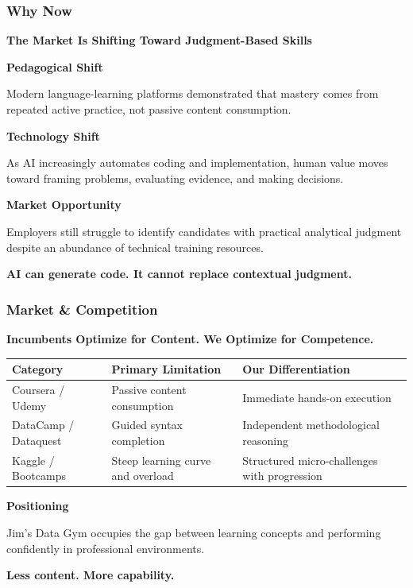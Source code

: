 \documentclass[aspectratio=169]{beamer}
\begin{document}
\begin{frame}
\frametitle{\textcolor{AccentPink}{Why Now}}

\Large \textbf{The Market Is Shifting Toward Judgment-Based Skills}

\vspace{0.3cm}

\textbf{Pedagogical Shift}

Modern language-learning platforms demonstrated that mastery comes from repeated active practice, not passive content consumption.

\vspace{0.2cm}

\textbf{Technology Shift}

As AI increasingly automates coding and implementation, human value moves toward framing problems, evaluating evidence, and making decisions.

\vspace{0.2cm}

\textbf{Market Opportunity}

Employers still struggle to identify candidates with practical analytical judgment despite an abundance of technical training resources.

\vspace{0.3cm}

\textcolor{AccentPink}{\textbf{AI can generate code. It cannot replace contextual judgment.}}
\end{frame}

\begin{frame}
\frametitle{\textcolor{AccentGreen}{Market \& Competition}}

\Large \textbf{Incumbents Optimize for Content. We Optimize for Competence.}

\vspace{0.3cm}

\small
\begin{tabular}{p{3.2cm} p{4.2cm} p{4.5cm}}
\toprule
\textbf{Category} & \textbf{Primary Limitation} & \textbf{Our Differentiation} \\
\midrule
Coursera / Udemy & Passive content consumption & Immediate hands-on execution \\
DataCamp / Dataquest & Guided syntax completion & Independent methodological reasoning \\
Kaggle / Bootcamps & Steep learning curve and overload & Structured micro-challenges with progression \\
\bottomrule
\end{tabular}

\vspace{0.5cm}

\textbf{Positioning}

Jim's Data Gym occupies the gap between learning concepts and performing confidently in professional environments.

\textcolor{AccentGreen}{\textbf{Less content. More capability.}}
\end{frame}
\end{document}
